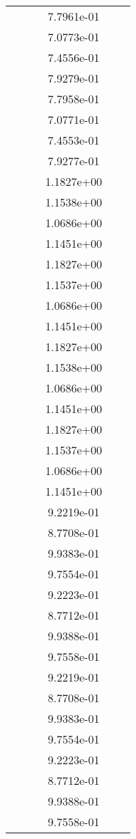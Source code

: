 \begin{xltabular}{\textwidth}{r|rS[table-format=1.3e+2]S[table-format=1.4e+2]S[table-format=1.4e+2]S[table-format=-1.5]}
&  &  & 7.7961e-01 & & \\
&  &  & 7.0773e-01 & & \\
&  &  & 7.4556e-01 & & \\
&  &  & 7.9279e-01 & & \\
&  &  & 7.7958e-01 & & \\
&  &  & 7.0771e-01 & & \\
&  &  & 7.4553e-01 & & \\
&  &  & 7.9277e-01 & & \\
&  &  & 1.1827e+00 & & \\
&  &  & 1.1538e+00 & & \\
&  &  & 1.0686e+00 & & \\
&  &  & 1.1451e+00 & & \\
&  &  & 1.1827e+00 & & \\
&  &  & 1.1537e+00 & & \\
&  &  & 1.0686e+00 & & \\
&  &  & 1.1451e+00 & & \\
&  &  & 1.1827e+00 & & \\
&  &  & 1.1538e+00 & & \\
&  &  & 1.0686e+00 & & \\
&  &  & 1.1451e+00 & & \\
&  &  & 1.1827e+00 & & \\
&  &  & 1.1537e+00 & & \\
&  &  & 1.0686e+00 & & \\
&  &  & 1.1451e+00 & & \\
&  &  & 9.2219e-01 & & \\
&  &  & 8.7708e-01 & & \\
&  &  & 9.9383e-01 & & \\
&  &  & 9.7554e-01 & & \\
&  &  & 9.2223e-01 & & \\
&  &  & 8.7712e-01 & & \\
&  &  & 9.9388e-01 & & \\
&  &  & 9.7558e-01 & & \\
&  &  & 9.2219e-01 & & \\
&  &  & 8.7708e-01 & & \\
&  &  & 9.9383e-01 & & \\
&  &  & 9.7554e-01 & & \\
&  &  & 9.2223e-01 & & \\
&  &  & 8.7712e-01 & & \\
&  &  & 9.9388e-01 & & \\
&  &  & 9.7558e-01 & & \\

\end{xltabular}
